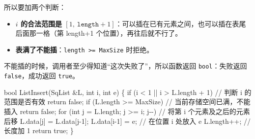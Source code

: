 \documentclass[10.5pt,a4paper,oneside]{article}
\providecommand{\tightlist}{\setlength{\itemsep}{2pt}\setlength{\parskip}{0pt}}
\newenvironment{Shaded}{}{}
\newcommand{\CommentTok}[1]{\textcolor[rgb]{0.18,0.55,0.23}{#1}}
\newcommand{\ControlFlowTok}[1]{\textcolor[rgb]{0.12,0.31,0.71}{#1}}
\newcommand{\DataTypeTok}[1]{\textcolor[rgb]{0.12,0.31,0.71}{#1}}
\newcommand{\DecValTok}[1]{\textcolor[rgb]{0.77,0.35,0.07}{#1}}
\newcommand{\KeywordTok}[1]{\textcolor[rgb]{0.12,0.31,0.71}{#1}}
\newcommand{\NormalTok}[1]{#1}
\newcommand{\OperatorTok}[1]{\textcolor[rgb]{0.20,0.20,0.20}{#1}}
\begin{document}
所以要加两个判断：

\begin{itemize}
\tightlist
\item
  \textbf{\(i\) 的合法范围是
  \([1,\ \texttt{length}+1]\)}：可以插在已有元素之间，也可以插在表尾后面那一格（第
  length+1 个位置），再往后就不行了。
\item
  \textbf{表满了不能插}：\texttt{length\ \textgreater{}=\ MaxSize}
  时拒绝。
\end{itemize}

不能插的时候，调用者至少得知道“这次失败了”，所以函数返回
\texttt{bool}：失败返回 \texttt{false}，成功返回 \texttt{true}。

\begin{Shaded}
\begin{Highlighting}[]
\DataTypeTok{bool}\NormalTok{ ListInsert}\OperatorTok{(}\NormalTok{SqList }\OperatorTok{\&}\NormalTok{L}\OperatorTok{,} \DataTypeTok{int}\NormalTok{ i}\OperatorTok{,} \DataTypeTok{int}\NormalTok{ e}\OperatorTok{)} \OperatorTok{\{}
    \ControlFlowTok{if} \OperatorTok{(}\NormalTok{i }\OperatorTok{\textless{}} \DecValTok{1} \OperatorTok{||}\NormalTok{ i }\OperatorTok{\textgreater{}}\NormalTok{ L}\OperatorTok{.}\NormalTok{length }\OperatorTok{+} \DecValTok{1}\OperatorTok{)}     \CommentTok{// 判断 i 的范围是否有效}
        \ControlFlowTok{return} \KeywordTok{false}\OperatorTok{;}
    \ControlFlowTok{if} \OperatorTok{(}\NormalTok{L}\OperatorTok{.}\NormalTok{length }\OperatorTok{\textgreater{}=}\NormalTok{ MaxSize}\OperatorTok{)}           \CommentTok{// 当前存储空间已满，不能插入}
        \ControlFlowTok{return} \KeywordTok{false}\OperatorTok{;}
    \ControlFlowTok{for} \OperatorTok{(}\DataTypeTok{int}\NormalTok{ j }\OperatorTok{=}\NormalTok{ L}\OperatorTok{.}\NormalTok{length}\OperatorTok{;}\NormalTok{ j }\OperatorTok{\textgreater{}=}\NormalTok{ i}\OperatorTok{;}\NormalTok{ j}\OperatorTok{{-}{-})}  \CommentTok{// 将第 i 个元素及之后的元素后移}
\NormalTok{        L}\OperatorTok{.}\NormalTok{data}\OperatorTok{[}\NormalTok{j}\OperatorTok{]} \OperatorTok{=}\NormalTok{ L}\OperatorTok{.}\NormalTok{data}\OperatorTok{[}\NormalTok{j}\OperatorTok{{-}}\DecValTok{1}\OperatorTok{];}
\NormalTok{    L}\OperatorTok{.}\NormalTok{data}\OperatorTok{[}\NormalTok{i}\OperatorTok{{-}}\DecValTok{1}\OperatorTok{]} \OperatorTok{=}\NormalTok{ e}\OperatorTok{;}                   \CommentTok{// 在位置 i 处放入 e}
\NormalTok{    L}\OperatorTok{.}\NormalTok{length}\OperatorTok{++;}                        \CommentTok{// 长度加 1}
    \ControlFlowTok{return} \KeywordTok{true}\OperatorTok{;}
\OperatorTok{\}}
\end{Highlighting}
\end{Shaded}
\end{document}
